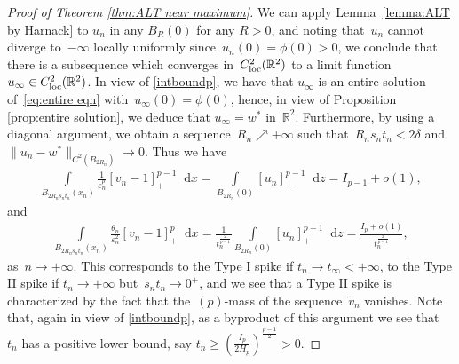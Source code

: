 \documentclass[10pt]{amsart}
\newcommand{\parenthesis}[1]{\left(#1\right)} %
\newcommand{\R}{\mathbb{R}}
\newcommand{\dd}{\mathop{}\!\mathrm{d}}
\newcommand{\eps}{\varepsilon}
\def\R{\mathbb{R}}
\renewcommand{\to}{\rightarrow}
\begin{document}
\begin{proof}[Proof of Theorem \ref{thm:ALT near maximum}]
       \medskip



        We can apply Lemma~\ref{lemma:ALT by Harnack} to $u_n$ in any $B_R(0)$ for any $R>0$,
        and noting that~$u_n$ cannot diverge to~$-\infty$ locally uniformly since~$u_n(0)=\phi(0)>0$, we conclude that
        there is a subsequence which converges in~$C^2_{\rm loc} (\R^2)$ to a limit function~$u_\infty\in C^2_{\rm loc}(\R^2)$. In view of \eqref{intboundp},
        we have that $u_\infty$ is an entire solution of~\eqref{eq:entire eqn} with~$u_\infty(0)=\phi(0)$, hence, in view of Proposition
        \ref{prop:entire solution}, we deduce that $u_\infty= w^*$ in~$\R^2$.
        Furthermore, by using a diagonal argument, we obtain a sequence~$R_n\nearrow +\infty$ such that~$ R_n s_n t_n < 2\delta$ and~$\|u_n - w^*\|_{C^2(B_{2R_n})}\to 0$.
        Thus we have
        \begin{align*}
            \int\limits_{B_{2R_n s_n t_n}(x_n)} \frac{1}{\eps_n^p}[v_n-1]_+^{p-1}\dd{x}
            =\int\limits_{B_{2R_n} (0)} [u_n]_+^{p-1}\dd{z} = I_{p-1} + o(1),
        \end{align*}
        and
        \begin{align*}
            \int\limits_{B_{2R_n s_n t_n}(x_n)} \frac{\theta_n}{\eps_n^2}[v_n-1]_+^{p}\dd{x}
            =\frac{1}{t_n^{\frac{2}{p-1}}}\int\limits_{B_{2R_n} (0)} [u_n]_+^{p-1}\dd{z}
            =\frac{I_p+ o(1)}{t_n^{\frac{2}{p-1}}},
        \end{align*}
        as~$n\to+\infty$.
        This corresponds to the Type I spike if $t_n\to t_\infty<+\infty$, to the Type II spike if $t_n\to+\infty$ but~$s_n t_n \to 0^+$, and
        we see that a Type II spike is characterized by the fact that the~$(p)$-mass of the sequence~$\tilde{v}_n$ vanishes.
        Note that, again in view of \eqref{intboundp}, as a byproduct of this argument we see that~$t_n$ has a positive lower bound,
        say $t_n\geq \parenthesis{\frac{I_p}{2H_p}}^{\frac{p-1}{2}}>0$.

       \bigskip


\end{proof}
\end{document}
